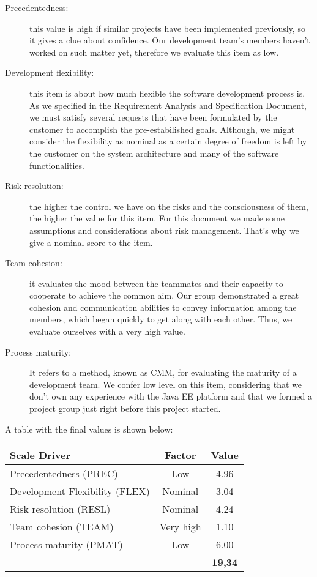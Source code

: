 \begin{description}
\item[Precedentedness:] this value is high if similar projects have been implemented previously, so it gives a clue about confidence. Our development team's members haven't worked on such matter yet, therefore we evaluate this item as low.
\item[Development flexibility:] this item is about how much flexible the software development process is. As we specified in the Requirement Analysis and Specification Document, we must satisfy several requests that have been formulated by the customer to accomplish the pre-estabilished goals. Although, we might consider the flexibility as nominal as a certain degree of freedom is left by the customer on the system architecture and many of the software functionalities.
\item[Risk resolution:] the higher the control we have on the risks and the consciousness of them, the higher the value for this item. For this document we made some assumptions and considerations about risk management. That's why we give a nominal score to the item.
\item[Team cohesion:] it evaluates the mood between the teammates and their capacity to cooperate to achieve the common aim. Our group demonstrated a great cohesion and communication abilities to convey information among the members, which began quickly to get along with each other. Thus, we evaluate ourselves with a very high value.
\item[Process maturity:] It refers to a method, known as CMM, for evaluating the maturity of a development team. We confer low level on this item, considering that we don't own any experience with the Java EE platform and that we formed a project group just right before this project started.
\end{description}
	
A table with the final values is shown below:
\begin{center}
\begin{tabular}{ | l | c | c | }
\hline
	\textbf{Scale Driver} & \textbf{Factor} & \textbf{Value}  \\ \hline\hline
	Precedentedness (PREC)& Low &  4.96 \\ \hline
	Development Flexibility (FLEX) & Nominal & 3.04 \\ \hline
	Risk resolution (RESL) & Nominal & 4.24  \\ \hline
	Team cohesion (TEAM)  & Very high &  1.10  \\ \hline
	Process maturity (PMAT) &  Low & 6.00 \\ \hline
         \multicolumn{1}{|l|}{}\textbf{Total} &  & \textbf{19,34} \\ \hline
\end{tabular}
\end{center}

